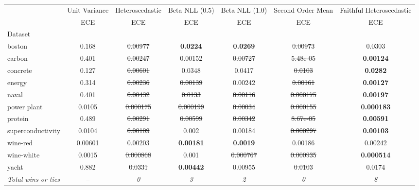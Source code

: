 \begin{tabular}{l|c|c|c|c|c|c}
\toprule
{} & {Unit Variance} & {Heteroscedastic} & {Beta NLL (0.5)} & {Beta NLL (1.0)} & {Second Order Mean} & {Faithful Heteroscedastic} \\
{} & {ECE} & {ECE} & {ECE} & {ECE} & {ECE} & {ECE} \\
{Dataset} & {} & {} & {} & {} & {} & {} \\
\midrule
boston & 0.168 & \sout{0.00977} & \textbf{0.0224} & \textbf{0.0269} & \sout{0.00973} & 0.0303 \\
carbon & 0.401 & \sout{0.00247} & 0.00152 & \sout{0.00727} & \sout{5.48e-05} & \textbf{0.00124} \\
concrete & 0.127 & \sout{0.00601} & 0.0348 & 0.0417 & \sout{0.0103} & \textbf{0.0282} \\
energy & 0.314 & \sout{0.00236} & \sout{0.00139} & 0.00242 & \sout{0.00161} & \textbf{0.00127} \\
naval & 0.401 & \sout{0.00432} & \sout{0.0133} & \sout{0.00116} & \sout{0.000175} & \textbf{0.00197} \\
power plant & 0.0105 & \sout{0.000175} & \sout{0.000199} & \sout{0.00034} & \sout{0.000155} & \textbf{0.000183} \\
protein & 0.489 & \sout{0.00291} & \sout{0.00599} & \sout{0.00342} & \sout{8.67e-05} & \textbf{0.00591} \\
superconductivity & 0.0104 & \sout{0.00109} & 0.002 & 0.00184 & \sout{0.000297} & \textbf{0.00103} \\
wine-red & 0.00601 & 0.00203 & \textbf{0.00181} & \textbf{0.0019} & 0.00186 & 0.00242 \\
wine-white & 0.0015 & \sout{0.000868} & 0.001 & \sout{0.000767} & \sout{0.000935} & \textbf{0.000514} \\
yacht & 0.882 & \sout{0.0331} & \textbf{0.00442} & 0.00955 & \sout{0.0103} & 0.0174 \\
\textit{{Total wins or ties}} & -- & \textit{0} & \textit{3} & \textit{2} & \textit{0} & \textit{8} \\
\bottomrule
\end{tabular}
